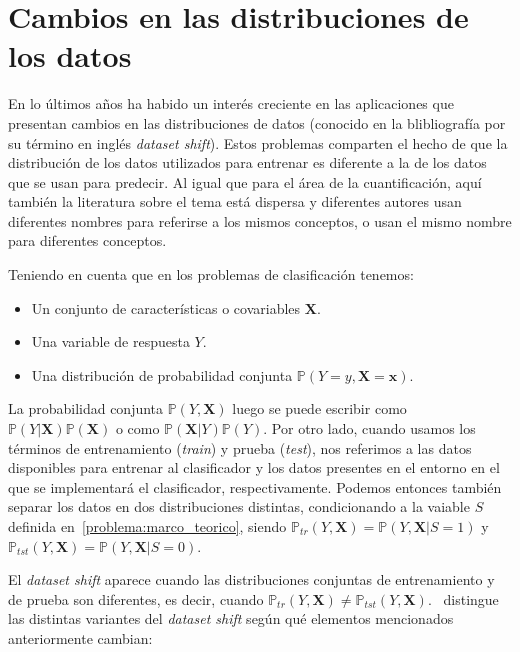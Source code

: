 \section{Cambios en las distribuciones de los datos}\label{problema:cambios}

En lo últimos años ha habido un interés creciente en las aplicaciones que
presentan cambios en las distribuciones de datos (conocido en la blibliografía
por su término en inglés {\it dataset shift\/}). Estos problemas comparten el
hecho de que la distribución de los datos utilizados para entrenar es diferente
a la de los datos que se usan para predecir. Al igual que para el área de la
cuantificación, aquí también la literatura sobre el tema está dispersa y
diferentes autores usan diferentes nombres para referirse a los mismos
conceptos, o usan el mismo nombre para diferentes conceptos.

Teniendo en cuenta que en los problemas de clasificación tenemos:

\begin{itemize}
    \item Un conjunto de características o covariables $\boldsymbol{X}$.
    \item Una variable de respuesta $Y$.
    \item Una distribución de probabilidad conjunta
    $\mathbb{P}(Y=y,\boldsymbol{X=x})$.
\end{itemize}

La probabilidad conjunta $\mathbb{P}(Y,\boldsymbol{X})$ luego se puede escribir
como $\mathbb{P}(Y|\boldsymbol{X})\mathbb{P}(\boldsymbol{X})$ o como
$\mathbb{P}(\boldsymbol{X}|Y)\mathbb{P}(Y)$. Por otro lado, cuando usamos los
términos de entrenamiento ({\it train\/}) y prueba ({\it test\/}), nos referimos
a las datos disponibles para entrenar al clasificador y los datos presentes en
el entorno en el que se implementará el clasificador, respectivamente. Podemos
entonces también separar los datos en dos distribuciones distintas,
condicionando a la vaiable $S$ definida en~\ref{problema:marco_teorico}, siendo
$\mathbb{P}_{tr}(Y,\boldsymbol{X})=\mathbb{P}(Y,\boldsymbol{X}|S=1)$ y
$\mathbb{P}_{tst}(Y,\boldsymbol{X})=\mathbb{P}(Y,\boldsymbol{X}|S=0)$.

El {\it dataset shift\/} aparece cuando las distribuciones conjuntas de
entrenamiento y de prueba son diferentes, es decir, cuando
$\mathbb{P}_{tr}(Y,\boldsymbol{X}) \neq
\mathbb{P}_{tst}(Y,\boldsymbol{X})$.~\citet{moreno2012unifying} distingue las
distintas variantes del {\it dataset shift\/} según qué elementos mencionados
anteriormente cambian:

